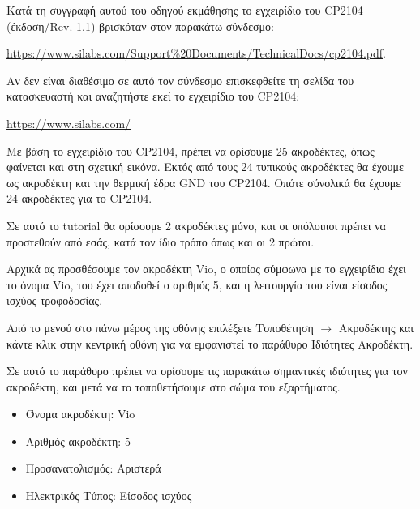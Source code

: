 \documentclass[a4paper]{article}
\begin{document}
Κατά τη συγγραφή αυτού του οδηγού εκμάθησης το εγχειρίδιο του \textenglish{CP2104} (έκδοση/Rev. 1.1) βρισκόταν στον παρακάτω σύνδεσμο:

\href{https://www.silabs.com/Support\%20Documents/TechnicalDocs/cp2104.pdf}{https://www.silabs.com/Support\%20Documents/TechnicalDocs/cp2104.pdf}. 

Αν δεν είναι διαθέσιμο σε αυτό τον σύνδεσμο επισκεφθείτε τη σελίδα του κατασκευαστή και αναζητήστε εκεί το εγχειρίδιο του \textenglish{CP2104}: 

\href{https://www.silabs.com/}{https://www.silabs.com/}

Με βάση το εγχειρίδιο του \textenglish{CP2104}, πρέπει να ορίσουμε 25 ακροδέκτες, όπως φαίνεται και στη σχετική εικόνα. Εκτός από τους 24 τυπικούς ακροδέκτες θα έχουμε ως ακροδέκτη και την θερμική έδρα GND του \textenglish{CP2104}. Οπότε σύνολικά θα έχουμε 24 ακροδέκτες για το \textenglish{CP2104}.

\begin{figure}
  \begin{center}
    \label{fig:kicad-main}
  \end{center}
\end{figure}

Σε αυτό το tutorial θα ορίσουμε 2 ακροδέκτες μόνο, και οι υπόλοιποι πρέπει να προστεθούν από εσάς, κατά τον ίδιο τρόπο όπως και οι 2 πρώτοι.

Αρχικά ας προσθέσουμε τον ακροδέκτη Vio, ο οποίος σύμφωνα με το εγχειρίδιο έχει το όνομα Vio, του έχει αποδοθεί ο αριθμός 5, και η λειτουργία του είναι είσοδος ισχύος τροφοδοσίας.

Από το μενού στο πάνω μέρος της οθόνης επιλέξετε Τοποθέτηση $\rightarrow$ Ακροδέκτης και κάντε κλικ στην κεντρική οθόνη για να εμφανιστεί το παράθυρο Ιδιότητες Ακροδέκτη.

\begin{figure}
  \begin{center}
    \label{fig:kicad-main}
  \end{center}
\end{figure}

Σε αυτό το παράθυρο πρέπει να ορίσουμε τις παρακάτω σημαντικές ιδιότητες για τον ακροδέκτη, και μετά να το τοποθετήσουμε στο σώμα του εξαρτήματος.

\begin{itemize}
    \item Όνομα ακροδέκτη: Vio
    \item Αριθμός ακροδέκτη: 5
    \item Προσανατολισμός: Αριστερά
    \item Ηλεκτρικός Τύπος: Είσοδος ισχύος
\end{itemize}
\end{document}
